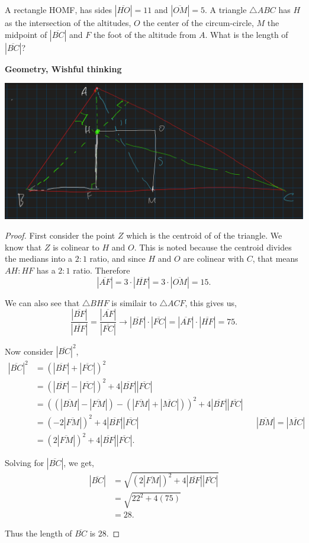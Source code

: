 \documentclass[11pt]{article}
\newenvironment{problem}[2][Problem\!]{\begin{trivlist}
\item[\hskip \labelsep {\bfseries #1}\hskip \labelsep {\bfseries #2}]}{\end{trivlist}}
\newcommand{\abs}[1]{\left\lvert#1\right\rvert} %
\begin{document}
\begin{tcolorbox}
    \begin{problem} {IC | 11/15 | 148. (Putnam)} 
      A rectangle HOMF, has sides $\abs{\overline{HO}} = 11$ and $\abs{\overline{OM}} = 5$. A triangle $\triangle ABC$ has $H$ as the intersection of the altitudes, $O$ the center of the circum-circle, $M$ the midpoint of $\abs{\overline{BC}}$ and $F$ the foot of the altitude from $A$. What is the length of $\abs{\overline{BC}}$?
    \end{problem}
    \textbf{Geometry, Wishful thinking }
  \end{tcolorbox}
  \includegraphics[scale=.5]{prob1}
  \begin{proof}
      \newcommand{\leng}[1]{\abs{\overline{#1}}}
      First consider the point $Z$ which is the centroid of of the triangle. We know that $Z$ is colinear to $H$ and $O$. This is noted because the centroid divides the medians into a $2:1$ ratio, and since $H$ and $O$ are colinear with $C$, that means $AH:HF$ has a $2:1$ ratio. Therefore \[\abs{\overline{AF}} = 3 \cdot \leng{HF} = 3 \cdot \leng{OM} = 15.\]
  
      We can also see that $\triangle BHF$ is similair to $\triangle ACF$, this gives us, \[\frac{\leng{BF}}{\leng{HF}} = \frac{\leng{AF}}{\leng{FC}} \rightarrow \leng{BF} \cdot \leng{FC} = \leng{AF} \cdot \leng{HF}  = 75. \]
  
      Now consider $\leng{BC}^{2}$, 
      \begin{align*}
          \leng{BC}^{2} &= (\leng{BF} + \leng{FC})^{2} \\
          &= (\leng{BF} - \leng{FC})^{2} + 4\leng{BF}\leng{FC} \\
          &= ((\leng{BM} - \leng{FM}) - (\leng{FM} + \leng{MC}))^{2} + 4\leng{BF}\leng{FC} \\
          &= (-2\leng{FM})^{2} + 4\leng{BF}\leng{FC} && \leng{BM} = \leng{MC} \\
          &= (2\leng{FM})^{2}+ 4\leng{BF}\leng{FC} .
      \end{align*}
  
      Solving for $\leng{BC}$, we get,
      \begin{align*}
          \leng{BC} &= \sqrt{(2\leng{FM})^{2}+ 4\leng{BF}\leng{FC}} \\
          &= \sqrt{22^{2} + 4(75)} \\
          &= 28.
      \end{align*}
  
      Thus the length of $\overline{BC}$ is 28.
  
  \end{proof}
\end{document}
